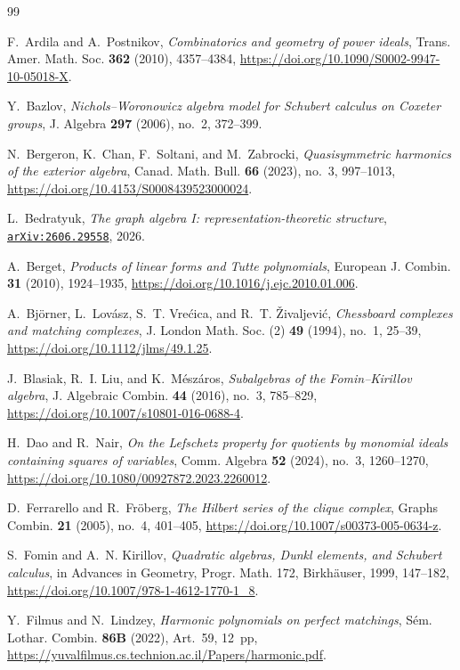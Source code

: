 \documentclass[12pt]{amsart}
\theoremstyle{definition}
\theoremstyle{remark}
\newcommand\arxiv[1]{\href{https://arxiv.org/abs/#1}{\texttt{arXiv:#1}}}
\begin{document}
\begin{thebibliography}{99}

F.~Ardila and A.~Postnikov,
\emph{Combinatorics and geometry of power ideals},
Trans. Amer. Math. Soc. \textbf{362} (2010), 4357--4384,
\url{https://doi.org/10.1090/S0002-9947-10-05018-X}.

Y.~Bazlov,
\emph{Nichols--Woronowicz algebra model for Schubert calculus on Coxeter groups},
J. Algebra \textbf{297} (2006), no.~2, 372--399.

N.~Bergeron, K.~Chan, F.~Soltani, and M.~Zabrocki,
\emph{Quasisymmetric harmonics of the exterior algebra},
Canad. Math. Bull. \textbf{66} (2023), no.~3, 997--1013,
\url{https://doi.org/10.4153/S0008439523000024}.

L.~Bedratyuk,
\emph{The graph algebra I: representation-theoretic structure},
\arxiv{2606.29558}, 2026.

A.~Berget,
\emph{Products of linear forms and Tutte polynomials},
European J. Combin. \textbf{31} (2010), 1924--1935,
\url{https://doi.org/10.1016/j.ejc.2010.01.006}.

A.~Bj\"orner, L.~Lov\'asz, S.~T. Vre\'cica, and R.~T. \v{Z}ivaljevi\'c,
\emph{Chessboard complexes and matching complexes},
J. London Math. Soc. (2) \textbf{49} (1994), no.~1, 25--39,
\url{https://doi.org/10.1112/jlms/49.1.25}.

J.~Blasiak, R.~I. Liu, and K.~M\'esz\'aros,
\emph{Subalgebras of the Fomin--Kirillov algebra},
J. Algebraic Combin. \textbf{44} (2016), no.~3, 785--829,
\url{https://doi.org/10.1007/s10801-016-0688-4}.

H.~Dao and R.~Nair,
\emph{On the Lefschetz property for quotients by monomial ideals containing
squares of variables},
Comm. Algebra \textbf{52} (2024), no.~3, 1260--1270,
\url{https://doi.org/10.1080/00927872.2023.2260012}.

D.~Ferrarello and R.~Fr\"oberg,
\emph{The Hilbert series of the clique complex},
Graphs Combin. \textbf{21} (2005), no.~4, 401--405,
\url{https://doi.org/10.1007/s00373-005-0634-z}.

S.~Fomin and A.~N. Kirillov,
\emph{Quadratic algebras, Dunkl elements, and Schubert calculus},
in Advances in Geometry, Progr. Math. 172, Birkh\"auser, 1999, 147--182,
\url{https://doi.org/10.1007/978-1-4612-1770-1_8}.

Y.~Filmus and N.~Lindzey,
\emph{Harmonic polynomials on perfect matchings},
S\'{e}m. Lothar. Combin. \textbf{86B} (2022), Art.~59, 12~pp,
\url{https://yuvalfilmus.cs.technion.ac.il/Papers/harmonic.pdf}.


\end{thebibliography}
\end{document}
